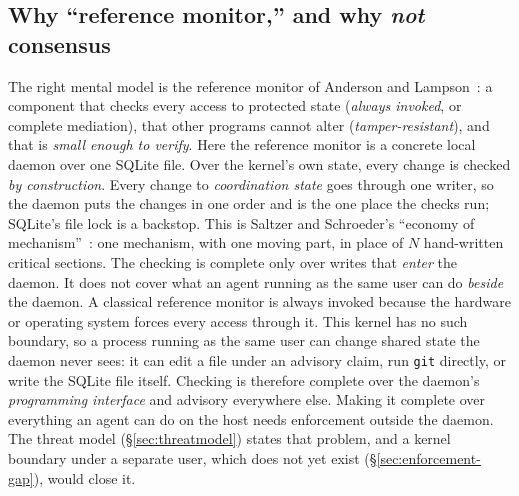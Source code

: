 \documentclass[11pt,a4paper]{article}
\theoremstyle{definition}
\theoremstyle{remark}
\begin{document}
\subsection{Why ``reference monitor,'' and why \emph{not} \mbox{consensus}}
\label{sec:swk-monitor}
The right mental model is the reference monitor of Anderson and
Lampson~: a component that checks every access
to protected state (\emph{always invoked}, or complete mediation), that other
programs cannot alter (\emph{tamper-resistant}), and that is \emph{small enough
to verify}. Here the reference monitor is a concrete local daemon over one
SQLite file. Over the kernel's own state, every change is checked \emph{by
construction}. Every change to \emph{coordination state} goes through one
writer, so the daemon puts the changes in one order and is the one place the
checks run; SQLite's file lock is a backstop. This is Saltzer and Schroeder's
``economy of mechanism''~: one mechanism, with one
moving part, in place of $N$ hand-written critical sections. The checking is complete only over
writes that \emph{enter} the daemon. It does not cover what an agent running as
the same user can do \emph{beside} the daemon. A classical reference monitor is
always invoked because the hardware or operating system forces every access
through it. This kernel has no such boundary, so a process running as the same
user can change shared state the daemon never sees: it can edit a file under an
advisory claim, run \texttt{git} directly, or write the SQLite file itself.
Checking is therefore complete over the daemon's \emph{programming interface}
and advisory everywhere else. Making it complete over everything an agent can
do on the host needs enforcement outside the daemon. The threat model
(\S\ref{sec:threatmodel}) states that problem, and a kernel boundary under a
separate user, which does not yet exist (\S\ref{sec:enforcement-gap}), would
close it.
\end{document}
